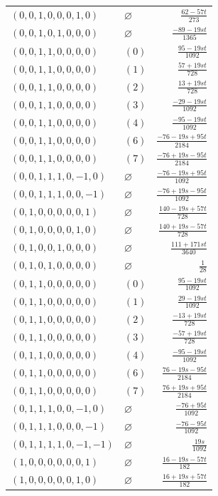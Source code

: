 \begin{longtable}{@{}llr@{}}
$(0,0,1,0,0,0,1,0)$ & $\varnothing$ & $\frac{62-57t}{273}$\\
$(0,0,1,0,1,0,0,0)$ & $\varnothing$ & $\frac{-89-19st}{1365}$\\
$(0,0,1,1,0,0,0,0)$ & $(0)$ & $\frac{95-19st}{1092}$\\
$(0,0,1,1,0,0,0,0)$ & $(1)$ & $\frac{57+19st}{728}$\\
$(0,0,1,1,0,0,0,0)$ & $(2)$ & $\frac{13+19st}{728}$\\
$(0,0,1,1,0,0,0,0)$ & $(3)$ & $\frac{-29-19st}{1092}$\\
$(0,0,1,1,0,0,0,0)$ & $(4)$ & $\frac{-95-19st}{1092}$\\
$(0,0,1,1,0,0,0,0)$ & $(6)$ & $\frac{-76-19s+95t}{2184}$\\
$(0,0,1,1,0,0,0,0)$ & $(7)$ & $\frac{-76+19s-95t}{2184}$\\
$(0,0,1,1,1,0,-1,0)$ & $\varnothing$ & $\frac{-76-19s+95t}{1092}$\\
$(0,0,1,1,1,0,0,-1)$ & $\varnothing$ & $\frac{-76+19s-95t}{1092}$\\
$(0,1,0,0,0,0,0,1)$ & $\varnothing$ & $\frac{140-19s+57t}{728}$\\
$(0,1,0,0,0,0,1,0)$ & $\varnothing$ & $\frac{140+19s-57t}{728}$\\
$(0,1,0,0,1,0,0,0)$ & $\varnothing$ & $\frac{111+171st}{3640}$\\
$(0,1,0,1,0,0,0,0)$ & $\varnothing$ & $\frac{1}{28}$\\
$(0,1,1,0,0,0,0,0)$ & $(0)$ & $\frac{95-19st}{1092}$\\
$(0,1,1,0,0,0,0,0)$ & $(1)$ & $\frac{29-19st}{1092}$\\
$(0,1,1,0,0,0,0,0)$ & $(2)$ & $\frac{-13+19st}{728}$\\
$(0,1,1,0,0,0,0,0)$ & $(3)$ & $\frac{-57+19st}{728}$\\
$(0,1,1,0,0,0,0,0)$ & $(4)$ & $\frac{-95-19st}{1092}$\\
$(0,1,1,0,0,0,0,0)$ & $(6)$ & $\frac{76-19s-95t}{2184}$\\
$(0,1,1,0,0,0,0,0)$ & $(7)$ & $\frac{76+19s+95t}{2184}$\\
$(0,1,1,1,0,0,-1,0)$ & $\varnothing$ & $\frac{-76+95t}{1092}$\\
$(0,1,1,1,0,0,0,-1)$ & $\varnothing$ & $\frac{-76-95t}{1092}$\\
$(0,1,1,1,1,0,-1,-1)$ & $\varnothing$ & $\frac{19s}{1092}$\\
$(1,0,0,0,0,0,0,1)$ & $\varnothing$ & $\frac{16-19s-57t}{182}$\\
$(1,0,0,0,0,0,1,0)$ & $\varnothing$ & $\frac{16+19s+57t}{182}$\\

\end{longtable}
